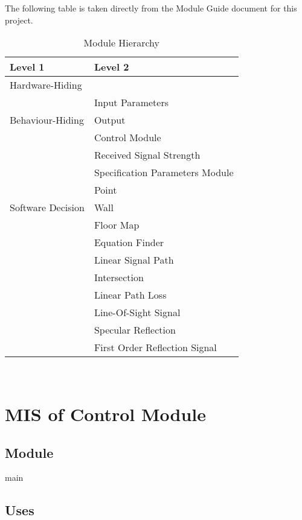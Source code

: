 \documentclass[12pt, titlepage]{article}
\begin{document}
The following table is taken directly from the Module Guide document for this project.

\begin{table}[h!]
\centering
\begin{tabular}{p{} p{}}
\toprule
\textbf{Level 1} & \textbf{Level 2}\\
\midrule

{Hardware-Hiding} & ~ \\
\midrule

\multirow{3}{0.3\textwidth}{Behaviour-Hiding} & Input Parameters\\
& Output\\
& Control Module\\
& Received Signal Strength\\
& Specification Parameters Module\\
\midrule

\multirow{3}{0.3\textwidth}{Software Decision} & Point\\
& Wall\\
& Floor Map\\
& Equation Finder\\
& Linear Signal Path\\
& Intersection\\
& Linear Path Loss\\
& Line-Of-Sight Signal\\
& Specular Reflection\\
& First Order Reflection Signal\\
\bottomrule

\end{tabular}
\caption{Module Hierarchy}
\label{TblMH}
\end{table}

\newpage
~\newpage

\section{MIS of Control Module} \label{controlModule}

\subsection{Module}

main

\subsection{Uses}
\end{document}
